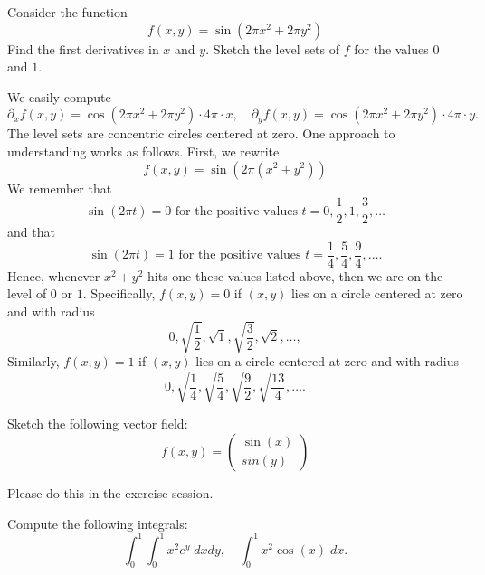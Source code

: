 \documentclass[11pt]{article}
\begin{document}
\begin{exercise}
	Consider the function 
    \[
        f(x,y) = \sin\left( 2\pi x^2 + 2\pi y^2 \right)
    \]
    Find the first derivatives in $x$ and $y$.
    Sketch the level sets of $f$ for the values $0$ and $1$.
\end{exercise}

\begin{solution}
    We easily compute 
    \[
        \partial_x f(x,y) = \cos\left( 2\pi x^2 + 2\pi y^2 \right) \cdot 4\pi \cdot x,
        \quad 
        \partial_y f(x,y) = \cos\left( 2\pi x^2 + 2\pi y^2 \right) \cdot 4\pi \cdot y.
    \]
    The level sets are concentric circles centered at zero. One approach to understanding works as follows.
    First, we rewrite 
    \[
        f(x,y) = \sin\left( 2\pi ( x^2 + y^2 ) \right)
    \]
    We remember 
    that 
    $$
        \sin( 2\pi t ) = 0 \text{ for the positive values } t = 0, \frac 1 2, 1, \frac 3 2, \dots
    $$ 
    and 
    that 
    $$
        \sin( 2\pi t ) = 1 \text{ for the positive values } t = \frac 1 4, \frac 5 4, \frac 9 4, \dots.
    $$
    Hence, whenever $x^2 + y^2$ hits one these values listed above, then we are on the level of $0$ or $1$.
    Specifically, $f(x,y) = 0$ if $(x,y)$ lies on a circle centered at zero and with radius
    $$
        0, \sqrt{\frac 1 2}, \sqrt{1}, \sqrt{\frac 3 2}, \sqrt{2}, \dots, 
    $$
    Similarly, $f(x,y) = 1$ if $(x,y)$ lies on a circle centered at zero and with radius
    $$
        0, \sqrt{\frac 1 4}, \sqrt{\frac 5 4}, \sqrt{\frac 9 2}, \sqrt{\frac {13} 4}, \dots. 
    $$
\end{solution}





\begin{exercise}
	Sketch the following vector field:
    \[
        f(x,y) = \left(\begin{array}{c} \sin(x) \\ sin(y) \end{array}\right)
    \]
\end{exercise}

\begin{solution}
    Please do this in the exercise session.
\end{solution}



\begin{exercise}
	Compute the following integrals:
    \[
        \int_0^1 \int_0^1 x^2 e^y \; dx dy,
        \quad 
        \int_0^1 x^2 \cos(x) \; dx.
    \]
\end{exercise}
\end{document}
